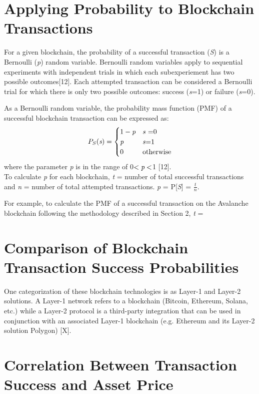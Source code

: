 \documentclass[12pt]{article}
\begin{document}
\section{Applying Probability to Blockchain Transactions}
For a given blockchain, the probability of a successful transaction (\emph{S}) is a Bernoulli (\emph{p}) random variable. Bernoulli random variables apply to sequential experiments with independent trials in which each subexperiement has two possible outcomes[12]. Each attempted transaction can be considered a Bernoulli trial for which there is only two possible outcomes: success (\emph{s}=1) or failure (\emph{s}=0).

As a Bernoulli random variable, the probability mass function (PMF) of a successful blockchain transaction can be expressed as:
\[
P_{S}(\emph{s}) =
\begin{cases}
1-\emph{p}&\text{\emph{s} =0}\\
\emph{p}&\text{\emph{s}=1}\\
0&\text{otherwise}\\
\end{cases}
\]
where the parameter \emph{p} is in the range of 0$<\emph{p}<$1 [12].\\

To calculate \emph{p} for each blockchain, \emph{t} = number of total successful transactions and \emph{n} = number of total attempted transactions. \emph{p} = P[\emph{S}] = \(\frac{t}{n}\).

For example, to calculate the PMF of a successful transaction on the Avalanche blockchain following the methodology described in Section 2, \emph{t} = 

\section{Comparison of Blockchain Transaction Success Probabilities}


One categorization of these blockchain technologies is as Layer-1 and Layer-2 solutions. A Layer-1 network refers to a blockchain (Bitcoin, Ethereum, Solana, etc.) while a Layer-2 protocol is a third-party integration that can be used in conjunction with an associated Layer-1 blockchain (e.g. Ethereum and its Layer-2 solution Polygon) [X].

\section{Correlation Between Transaction Success and Asset Price}
\end{document}
